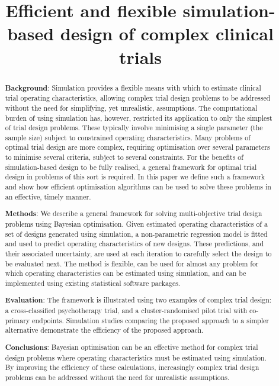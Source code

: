 \documentclass{article} %
\title{Efficient and flexible simulation-based design of complex clinical trials}
\date{}
\begin{document}
\maketitle

\begin{abstract}
\textbf{Background}: Simulation provides a flexible means with which to estimate clinical trial operating characteristics, allowing complex trial design problems to be addressed without the need for simplifying, yet unrealistic, assumptions. The computational burden of using simulation has, however, restricted its application to only the simplest of trial design problems. These typically involve minimising a single parameter (the sample size) subject to constrained operating characteristics. Many problems of optimal trial design are more complex, requiring optimisation over several parameters to minimise several criteria, subject to several constraints. For the benefits of simulation-based design to be fully realised, a general framework for optimal trial design in problems of this sort is required. In this paper we define such a framework and show how efficient optimisation algorithms can be used to solve these problems in an effective, timely manner.

\textbf{Methods}: We describe a general framework for solving multi-objective trial design problems using Bayesian optimisation. Given estimated operating characteristics of a set of designs generated using simulation, a non-parametric regression model is fitted and used to predict operating characteristics of new designs. These predictions, and their associated uncertainty, are used at each iteration to carefully select the design to be evaluated next. The method is flexible, can be used for almost any problem for which operating characteristics can be estimated using simulation, and can be implemented using existing statistical software packages.

\textbf{Evaluation}: The framework is illustrated using two examples of complex trial design: a cross-classified psychotherapy trial, and a cluster-randomised pilot trial with co-primary endpoints. Simulation studies comparing the proposed approach to a simpler alternative demonstrate the efficiency of the proposed approach.

\textbf{Conclusions}: Bayesian optimisation can be an effective method for complex trial design problems where operating characteristics must be estimated using simulation. By improving the efficiency of these calculations, increasingly complex trial design problems can be addressed without the need for unrealistic assumptions.
\end{abstract}
\end{document}
